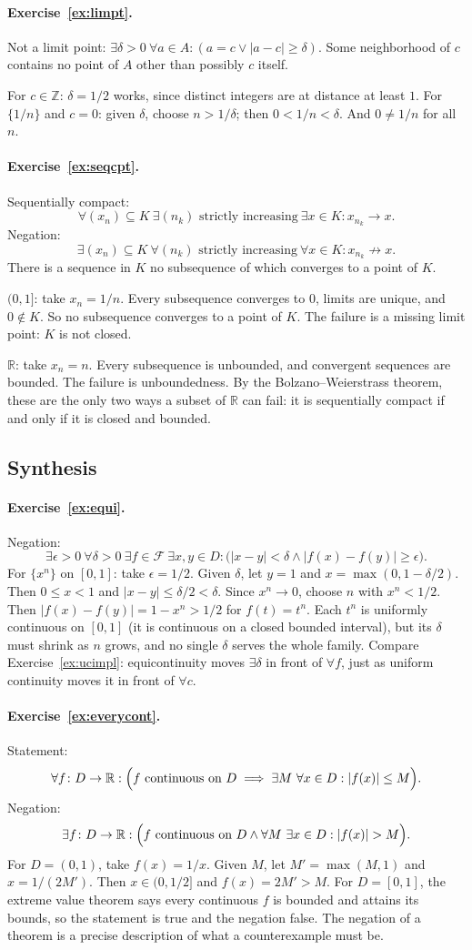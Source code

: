 \documentclass{workbook}
\theoremstyle{definition}
\newcommand{\Z}{\mathbb{Z}}
\newcommand{\R}{\mathbb{R}}
\newcommand{\ans}[1]{\paragraph{Exercise~\ref{#1}.}}
\begin{document}
\ans{ex:limpt}
Not a limit point: $\exists \delta > 0\ \forall a \in A : (a = c \lor |a - c| \ge \delta)$. Some neighborhood of $c$ contains no point of $A$ other than possibly $c$ itself.

For $c \in \Z$: $\delta = 1/2$ works, since distinct integers are at distance at least $1$. For $\{1/n\}$ and $c = 0$: given $\delta$, choose $n > 1/\delta$; then $0 < 1/n < \delta$. And $0 \ne 1/n$ for all $n$.

\ans{ex:seqcpt}
Sequentially compact:
\[
  \forall (x_n) \subseteq K\ \exists (n_k) \text{ strictly increasing}\ \exists x \in K : x_{n_k} \to x.
\]
Negation:
\[
  \exists (x_n) \subseteq K\ \forall (n_k) \text{ strictly increasing}\ \forall x \in K : x_{n_k} \not\to x.
\]
There is a sequence in $K$ no subsequence of which converges to a point of $K$.

$(0,1]$: take $x_n = 1/n$. Every subsequence converges to $0$, limits are unique, and $0 \notin K$. So no subsequence converges to a point of $K$. The failure is a missing limit point: $K$ is not closed.

$\R$: take $x_n = n$. Every subsequence is unbounded, and convergent sequences are bounded. The failure is unboundedness. By the Bolzano--Weierstrass theorem, these are the only two ways a subset of $\R$ can fail: it is sequentially compact if and only if it is closed and bounded.

\subsection*{Synthesis}

\ans{ex:equi}
Negation:
\[
  \exists \epsilon > 0\ \forall \delta > 0\ \exists f \in \mathcal{F}\ \exists x, y \in D : \bigl(|x - y| < \delta \land |f(x) - f(y)| \ge \epsilon\bigr).
\]
For $\{x^n\}$ on $[0,1]$: take $\epsilon = 1/2$. Given $\delta$, let $y = 1$ and $x = \max(0, 1 - \delta/2)$. Then $0 \le x < 1$ and $|x - y| \le \delta/2 < \delta$. Since $x^n \to 0$, choose $n$ with $x^n < 1/2$. Then $|f(x) - f(y)| = 1 - x^n > 1/2$ for $f(t) = t^n$. Each $t^n$ is uniformly continuous on $[0,1]$ (it is continuous on a closed bounded interval), but its $\delta$ must shrink as $n$ grows, and no single $\delta$ serves the whole family. Compare Exercise~\ref{ex:ucimpl}: equicontinuity moves $\exists \delta$ in front of $\forall f$, just as uniform continuity moves it in front of $\forall c$.

\ans{ex:everycont}
Statement:
\[
  \forall f \colon D \to \R : \Bigl( f \text{ continuous on } D \implies \exists M\ \forall x \in D : |f(x)| \le M \Bigr).
\]
Negation:
\[
  \exists f \colon D \to \R : \Bigl( f \text{ continuous on } D \land \forall M\ \exists x \in D : |f(x)| > M \Bigr).
\]
For $D = (0,1)$, take $f(x) = 1/x$. Given $M$, let $M' = \max(M, 1)$ and $x = 1/(2M')$. Then $x \in (0, 1/2]$ and $f(x) = 2M' > M$. For $D = [0,1]$, the extreme value theorem says every continuous $f$ is bounded and attains its bounds, so the statement is true and the negation false. The negation of a theorem is a precise description of what a counterexample must be.
\end{document}
